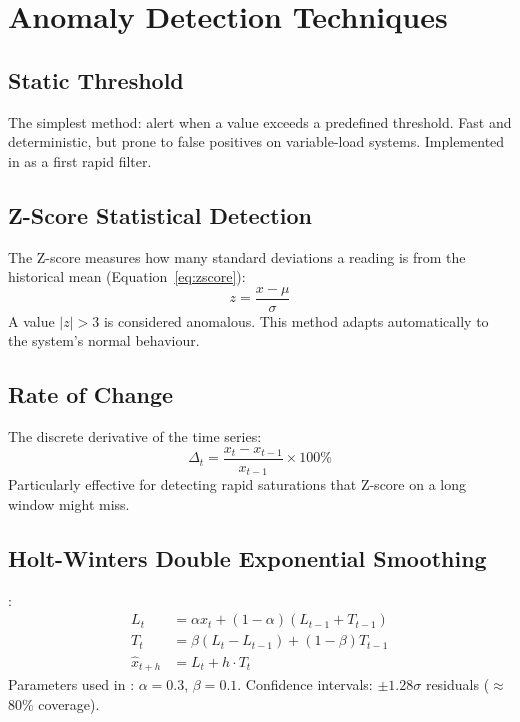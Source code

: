 \section{Anomaly Detection Techniques}

\subsection{Static Threshold}

The simplest method: alert when a value exceeds a predefined threshold.
Fast and deterministic, but prone to false positives on variable-load systems.
Implemented in \caimp{} as a first rapid filter.

\subsection{Z-Score Statistical Detection}

The Z-score measures how many standard deviations a reading is from the
historical mean (Equation~\ref{eq:zscore}):
\begin{equation}
  z = \frac{x - \mu}{\sigma}
  \label{eq:zscore}
\end{equation}
A value $|z| > 3$ is considered anomalous. This method adapts automatically
to the system's normal behaviour.

\subsection{Rate of Change}

The discrete derivative of the time series:
\begin{equation}
  \Delta_t = \frac{x_t - x_{t-1}}{x_{t-1}} \times 100\%
\end{equation}
Particularly effective for detecting rapid saturations that Z-score on a long
window might miss.

\subsection{Holt-Winters Double Exponential Smoothing}

\cite{holt1957forecasting,winters1960forecasting}:
\begin{align}
  L_t &= \alpha x_t + (1-\alpha)(L_{t-1} + T_{t-1}) \\
  T_t &= \beta(L_t - L_{t-1}) + (1-\beta)T_{t-1} \\
  \hat{x}_{t+h} &= L_t + h \cdot T_t
\end{align}
Parameters used in \caimp{}: $\alpha = 0.3$, $\beta = 0.1$.
Confidence intervals: $\pm 1.28\sigma$ residuals ($\approx$80\% coverage).


